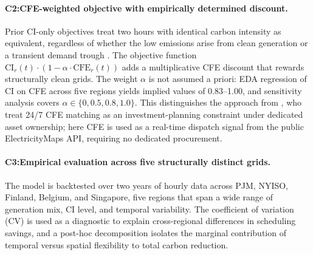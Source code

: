 \documentclass[11pt, a4paper]{article}
\begin{document}
\paragraph{C2:CFE-weighted objective with empirically determined discount.}
Prior CI-only objectives treat two hours with identical carbon intensity as equivalent, regardless of whether the low emissions arise from clean generation or a transient demand trough \citep{radovanovic2023}. The objective function $\text{CI}_r(t)\cdot(1-\alpha\cdot\text{CFE}_r(t))$ adds a multiplicative CFE discount that rewards structurally clean grids. The weight $\alpha$ is not assumed a priori: EDA regression of CI on CFE across five regions yields implied values of 0.83--1.00, and sensitivity analysis covers $\alpha \in \{0, 0.5, 0.8, 1.0\}$. This distinguishes the approach from \citet{riepin2024spatiotemporal}, who treat 24/7 CFE matching as an investment-planning constraint under dedicated asset ownership; here CFE is used as a real-time dispatch signal from the public ElectricityMaps API, requiring no dedicated procurement.

\paragraph{C3:Empirical evaluation across five structurally distinct grids.}
The model is backtested over two years of hourly data across PJM, NYISO, Finland, Belgium, and Singapore, five regions that span a wide range of generation mix, CI level, and temporal variability. The coefficient of variation (CV) is used as a diagnostic to explain cross-regional differences in scheduling savings, and a post-hoc decomposition isolates the marginal contribution of temporal versus spatial flexibility to total carbon reduction.



\end{document}
